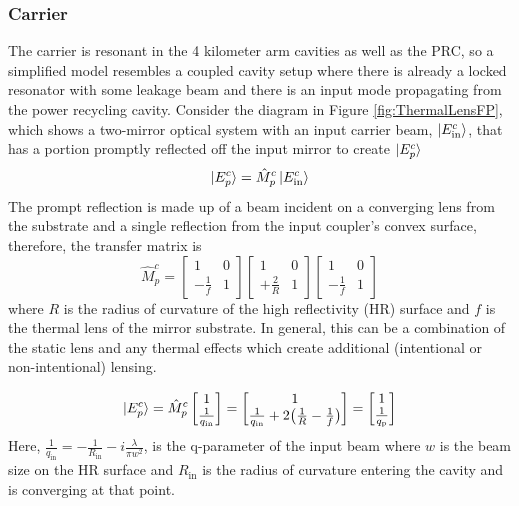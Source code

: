 		\subsubsection{Carrier}\label{Sec:carrier_lensing}
		The carrier is resonant in the 4 kilometer arm cavities as well as the PRC, so a simplified model resembles a coupled cavity setup where there is already a locked resonator with some leakage beam and there is an input mode propagating from the power recycling cavity.  Consider the diagram in Figure \ref{fig:ThermalLensFP}, which shows a two-mirror optical system with an input carrier beam, $\ket{E^c_{\text{in}}}$, that has a portion promptly reflected off the input mirror to create $\ket{E^c_{p}}$
		\begin{equation}
		\ket{E^{c}_{p}} = \hat{M}^{c}_{p} \ket{E^{c}_{\text{in}}}
		\end{equation}
		The prompt reflection is made up of a beam incident on a converging lens from the substrate and a single reflection from the input coupler's convex surface, therefore, the transfer matrix is
		\begin{equation}
		\hat{M}^{c}_{p} = 
		\begin{bmatrix}
						1 	&	0 
		\\ 	-\frac{1}{f} 	&	1
		\end{bmatrix}
		\begin{bmatrix}
						1 	&	0 
		\\ 	+\frac{2}{R} 	&	1
		\end{bmatrix}
		\begin{bmatrix}
						1 	&	0 
		\\ 	-\frac{1}{f} 	&	1
		\end{bmatrix}
		\end{equation}
		where $R$ is the radius of curvature of the high reflectivity (HR) surface and $f$ is the thermal lens of the mirror substrate. In general, this can be a combination of the static lens and any thermal effects which create additional (intentional or non-intentional) lensing.
		
		\begin{equation}\label{eq:promptE}
		 \ket{E^{c}_{p}}=
		 \hat{M}^{c}_{p}
		 \begin{bmatrix}
		 					1  
		 \\ 	\frac{1}{q_{\text{in}}}
		 \end{bmatrix}
		 =
		 \begin{bmatrix}
		 1  
		 \\ 	\frac{1}{q_{\text{in}}} + 2 \big(\frac{1}{R} - \frac{1}{f}\big)
		 \end{bmatrix}
		 =
		 \begin{bmatrix}
		 1  
		 \\ 	\frac{1}{q_{\text{p}}}
		 \end{bmatrix}
		\end{equation}
		Here, $\frac{1}{q_{\text{in}}} = -\frac{1}{R_{\text{in}}} - i \frac{\lambda}{\pi w^2}$, is the q-parameter of the input beam where $w$ is the beam size on the HR surface and $R_{\text{in}}$ is the radius of curvature entering the cavity and is converging at that point.
		
